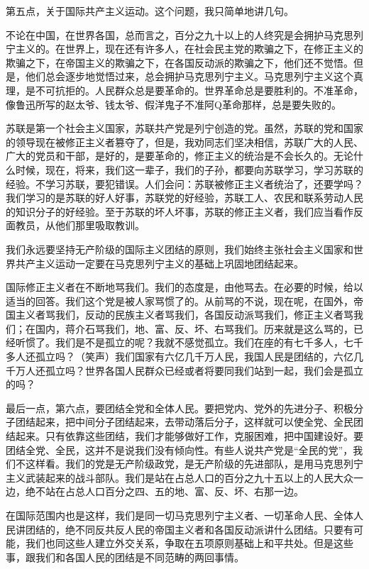 第五点，关于国际共产主义运动。这个问题，我只简单地讲几句。

不论在中国，在世界各国，总而言之，百分之九十以上的人终究是会拥护马克思列宁主义的。在世界上，现在还有许多人，在社会民主党的欺骗之下，在修正主义的欺骗之下，在帝国主义的欺骗之下，在各国反动派的欺骗之下，他们还不觉悟。但是，他们总会逐步地觉悟过来，总会拥护马克思列宁主义。马克思列宁主义这个真理，是不可抗拒的。人民群众总是要革命的。世界革命总是要胜利的。不准革命，像鲁迅所写的赵太爷、钱太爷、假洋鬼子不准阿Q革命那样，总是要失败的。

苏联是第一个社会主义国家，苏联共产党是列宁创造的党。虽然，苏联的党和国家的领导现在被修正主义者篡夺了，但是，我劝同志们坚决相信，苏联广大的人民、广大的党员和干部，是好的，是要革命的，修正主义的统治是不会长久的。无论什么时候，现在，将来，我们这一辈子，我们的子孙，都要向苏联学习，学习苏联的经验。不学习苏联，要犯错误。人们会问：苏联被修正主义者统治了，还要学吗？我们学习的是苏联的好人好事，苏联党的好经验，苏联工人、农民和联系劳动人民的知识分子的好经验。至于苏联的坏人坏事，苏联的修正主义者，我们应当看作反面教员，从他们那里吸取教训。

我们永远要坚持无产阶级的国际主义团结的原则，我们始终主张社会主义国家和世界共产主义运动一定要在马克思列宁主义的基础上巩固地团结起来。

国际修正主义者在不断地骂我们。我们的态度是，由他骂去。在必要的时候，给以适当的回答。我们这个党是被人家骂惯了的。从前骂的不说，现在呢，在国外，帝国主义者骂我们，反动的民族主义者骂我们，各国反动派骂我们，修正主义者骂我们；在国内，蒋介石骂我们，地、富、反、坏、右骂我们。历来就是这么骂的，已经听惯了。我们是不是孤立的呢？我就不感觉孤立。我们在座的有七千多人，七千多人还孤立吗？（笑声）我们国家有六亿几千万人民，我国人民是团结的，六亿几千万人还孤立吗？世界各国人民群众已经或者将要同我们站到一起，我们会是孤立的吗？

最后一点，第六点，要团结全党和全体人民。要把党内、党外的先进分子、积极分子团结起来，把中间分子团结起来，去带动落后分子，这样就可以使全党、全民团结起来。只有依靠这些团结，我们才能够做好工作，克服困难，把中国建设好。要团结全党、全民，这并不是说我们没有倾向性。有些人说共产党是“全民的党”，我们不这样看。我们的党是无产阶级政党，是无产阶级的先进部队，是用马克思列宁主义武装起来的战斗部队。我们是站在占总人口的百分之九十五以上的人民大众一边，绝不站在占总人口百分之四、五的地、富、反、坏、右那一边。

在国际范围内也是这样，我们是同一切马克思列宁主义者、一切革命人民、全体人民讲团结的，绝不同反共反人民的帝国主义者和各国反动派讲什么团结。只要有可能，我们也同这些人建立外交关系，争取在五项原则基础上和平共处。但是这些事，跟我们和各国人民的团结是不同范畴的两回事情。

